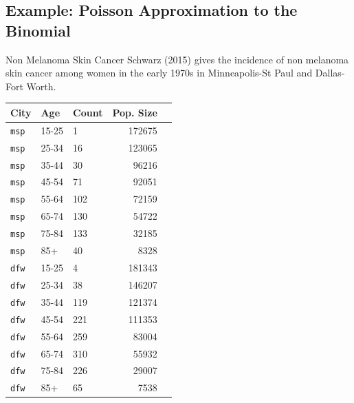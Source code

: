 \documentclass[oneside]{book}\usepackage[]{graphicx}\usepackage[svgnames]{xcolor}
\begin{document}
\subsection*{Example: Poisson Approximation to the Binomial}
\begin{Example}{Non Melanoma Skin Cancer}
    Schwarz (2015) gives the incidence of non melanoma skin cancer among women in the early
    1970s in Minneapolis-St Paul and Dallas-Fort Worth.
    \begin{center}
        \begin{tabular}{lllrr}
            \toprule
            City         & Age   & Count & Pop. Size \\
            \midrule
            \texttt{msp} & 15-25 & 1     & 172675    \\
            \texttt{msp} & 25-34 & 16    & 123065    \\
            \texttt{msp} & 35-44 & 30    & 96216     \\
            \texttt{msp} & 45-54 & 71    & 92051     \\
            \texttt{msp} & 55-64 & 102   & 72159     \\
            \texttt{msp} & 65-74 & 130   & 54722     \\
            \texttt{msp} & 75-84 & 133   & 32185     \\
            \texttt{msp} & 85+   & 40    & 8328      \\
            \texttt{dfw} & 15-25 & 4     & 181343    \\
            \texttt{dfw} & 25-34 & 38    & 146207    \\
            \texttt{dfw} & 35-44 & 119   & 121374    \\
            \texttt{dfw} & 45-54 & 221   & 111353    \\
            \texttt{dfw} & 55-64 & 259   & 83004     \\
            \texttt{dfw} & 65-74 & 310   & 55932     \\
            \texttt{dfw} & 75-84 & 226   & 29007     \\
            \texttt{dfw} & 85+   & 65    & 7538      \\
            \bottomrule
        \end{tabular}
    \end{center}
\end{Example}
\end{document}
